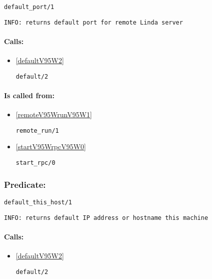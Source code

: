 \begin{verbatim}
default_port/1
\end{verbatim}

{\small \begin{verbatim}
INFO: returns default port for remote Linda server

\end{verbatim}}
\paragraph{Calls:} 
\begin{itemize}
\item \ref{defaultV95W2} 
\begin{verbatim}
default/2
\end{verbatim}

\end{itemize}
\paragraph{Is called from:} 
\begin{itemize}
\item \ref{remoteV95WrunV95W1} 
\begin{verbatim}
remote_run/1
\end{verbatim}

\item \ref{startV95WrpcV95W0} 
\begin{verbatim}
start_rpc/0
\end{verbatim}

\end{itemize}

\subsubsection{Predicate:} \label{defaultV95WthisV95WhostV95W1}

\begin{verbatim}
default_this_host/1
\end{verbatim}

{\small \begin{verbatim}
INFO: returns default IP address or hostname this machine

\end{verbatim}}
\paragraph{Calls:} 
\begin{itemize}
\item \ref{defaultV95W2} 
\begin{verbatim}
default/2
\end{verbatim}

\end{itemize}

